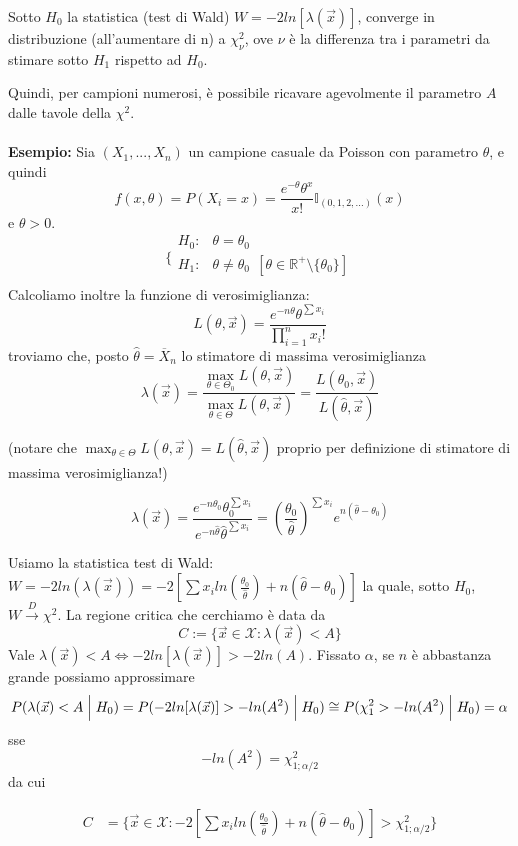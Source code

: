 \begin{teo}
Sotto $H_0$ la statistica (test di Wald) $W=-2ln[\lambda(\vec{x})]$, converge in distribuzione (all'aumentare di n) a $\chi^2_\nu$, ove $\nu$ è la differenza tra i parametri da stimare sotto $H_1$ rispetto ad $H_0$.
\end{teo}

Quindi, per campioni numerosi, è possibile ricavare agevolmente il parametro $A$ dalle tavole della $\chi^2$.\\
\\
\noindent \textbf{Esempio:} Sia $(X_1,...,X_n)$ un campione casuale da Poisson con parametro $\theta$, e quindi $$f(x,\theta) = P(X_i = x) = \frac{e^{-\theta} \theta^x}{x!} \mathbb{I}_{(0,1,2,...)}(x)$$ e $\theta>0$.
$$\bigg \{
\begin{array}{rl}
H_0: & \theta = \theta_0  \\
H_1: & \theta \neq \theta_0 \ \ [\theta \in \mathbb{R}^+ \setminus \{\theta_0\}]\\
\end{array}
$$
Calcoliamo inoltre la funzione di verosimiglianza:
$$L(\theta,\vec{x})=\frac{e^{-n\theta} \theta^{\sum x_i}}{\prod_{i=1}^n x_i!}$$
troviamo che, posto $\hat{\theta} = \overline{X}_n$ lo stimatore di massima verosimiglianza
$$\lambda(\vec{x}) = \frac{\max_{\theta \in \Theta_0} L(\theta,\vec{x})}{\max_{\theta \in \Theta} L(\theta,\vec{x})} = \frac{L(\theta_0,\vec{x})}{L(\hat{\theta},\vec{x})}$$

(notare che $\max_{\theta \in \Theta} L(\theta,\vec{x})=L(\hat{\theta},\vec{x}) $ proprio per definizione di stimatore di massima verosimiglianza!)

$$\lambda(\vec{x}) = \dfrac{ e^{-n\theta_0} \theta_0^{\sum x_i}}{e^{-n\hat{\theta}} \hat{\theta}^{\sum x_i}} = 
\left( \frac{\theta_0}{\hat{\theta}} \right)^{\sum x_i} e^{n(\hat{\theta} - \theta_0)}$$

Usiamo la statistica test di Wald:
$W = -2 ln (\lambda (\vec{x})) =  -2\left[\sum x_i ln \left( \frac{\theta_0}{\hat{\theta}} \right) + n(\hat{\theta} - \theta_0) \right]$
la quale, sotto $H_0$, $W \stackrel{D}{\longrightarrow} \chi^2$.
La regione critica che cerchiamo è data da
$$C := \{ \vec{x} \in \mathcal{X}: \lambda(\vec{x})<A \}$$
Vale $\lambda(\vec{x})<A \Leftrightarrow -2ln[ \lambda(\vec{x})]> -2ln(A)$.
Fissato $\alpha$, se $n$ è abbastanza grande possiamo approssimare
 $$P(\lambda(\vec{x})<A \Bigm\vert H_0) = P(-2ln[ \lambda(\vec{x})]> -ln(A^2) \Bigm\vert H_0) \cong P(\chi^2_1> -ln(A^2)\Bigm\vert H_0) = \alpha$$ sse $$-ln(A^2) = \chi_{1;\alpha/2}^2$$ da cui 

\begin{align*}
C  &= \{ \vec{x} \in \mathcal{X}: -2\left[\sum x_i ln \left( \frac{\theta_0}{\hat{\theta}} \right) + n(\hat{\theta} - \theta_0) \right] >  \chi_{1;\alpha/2}^2 \}
\end{align*}